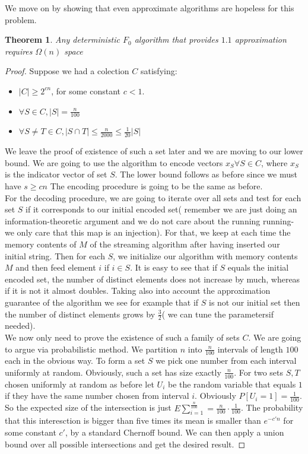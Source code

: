 \documentclass[11pt]{article}
\newtheorem{theorem}{Theorem}
\begin{document}
We move on by showing that even approximate algorithms are hopeless for this problem.	

 \begin{theorem} Any deterministic $F_0$ algorithm that provides $1.1$ approximation requires $\Omega(n)$ space \end{theorem}

\begin{proof}

Suppose we had a colection $C$ satisfying:

\begin{itemize}
\item $|C| \geq 2^{cn}$, for some constant $c<1$. 
\item  $\forall S \in C, |S| = \frac{n}{100}$
\item $\forall S \neq T \in C, |S \cap T | \leq \frac{n}{2000} \leq \frac{1}{20} |S|$
\end{itemize}


We leave the proof of existence of such a set later and we are moving to our lower bound. We are going to use the algorithm to encode vectors $x_S \forall S \in C$, where $x_S$ is the indicator vector of set $S$. The lower bound follows as before since we must have $s \geq cn$ The encoding procedure is going to be the same as before. \\
For the decoding procedure, we are going to iterate over all sets and test for each set $S$ if it corresponds to our initial encoded set( remember we are just doing an information-theoretic argument and we do not care about the running running- we only care that this map is an injection).  For that, we keep at each time the memory contents of $M$ of the streaming algorithm after having inserted our initial string. Then  for each $S$, we initialize our algorithm with memory contents $M$ and then feed element $i$ if $i \in S$. It is easy to see that if $S$ equals the initial encoded set, the number of distinct elements does not increase by much, whereas if it is not it almost doubles. Taking also into account the approximation guarantee of the algorithm we see for example that if $S$ is not our initial set then the number of distinct elements grows by $\frac{3}{2}$( we can tune the parametersif needed).\\


We now only need to prove the existence of such a family of sets $C$. We are going to argue via probabilistic method.  We partition $n$ into $\frac{n}{100}$ intervals of length $100$ each in the obvious way. To form a set $S$ we pick one number from each interval uniformly at random. Obviously, such a set has size exactly $\frac{n}{100}$. For two sets $S,T$ chosen uniformly at random as before let $U_i$ be the random variable that equals $1$ if they have the same number chosen from interval $i$. Obviously $P[U_i = 1 ] = \frac{1}{100}$. So the expected size of the intersection is just $E \sum_{i=1}^{\frac{n}{100}} = \frac{n}{100} \cdot \frac{1}{100}$. The probability that this interesction is bigger than five times its mean is smaller than $e^{-c'n}$ for some constant $c'$, by a standard Chernoff bound. We can then apply a union bound over all possible intersections and get the desired result.


\end{proof}
\end{document}
